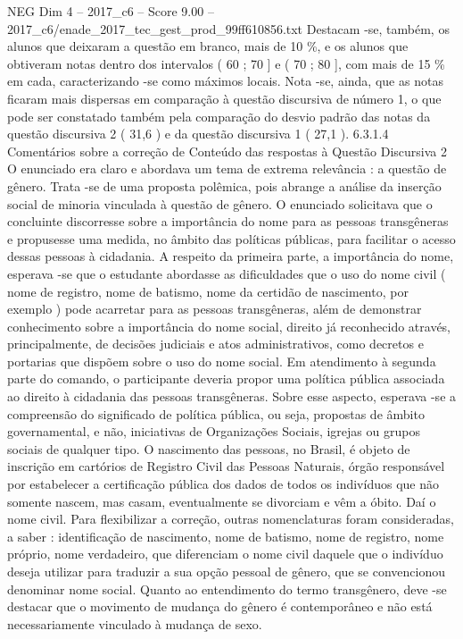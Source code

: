 \begin{textsample}{NEG Dim 4 – 2017\_c6 – Score 9.00 – 2017\_c6/enade\_2017\_tec\_gest\_prod\_99ff610856.txt}
Destacam -se, também, os alunos que deixaram a questão em branco, mais de 10 \%, e os alunos que obtiveram notas dentro dos intervalos ( 60 ; 70 ] e ( 70 ; 80 ], com mais de 15 \% em cada, caracterizando -se como máximos locais.
Nota -se, ainda, que as notas ficaram mais dispersas em comparação à questão discursiva de número 1, o que pode ser constatado também pela comparação do desvio padrão das notas da questão discursiva 2 ( 31,6 ) e da questão discursiva 1 ( 27,1 ). 6.3.1.4 Comentários sobre a correção de Conteúdo das respostas à Questão Discursiva 2 O enunciado era claro e abordava um tema de extrema relevância : a questão de gênero.
Trata -se de uma proposta polêmica, pois abrange a análise da inserção social de minoria vinculada à questão de gênero.
O enunciado solicitava que o concluinte discorresse sobre a importância do nome para as pessoas transgêneras e propusesse uma medida, no âmbito das políticas públicas, para facilitar o acesso dessas pessoas à cidadania.
A respeito da primeira parte, a importância do nome, esperava -se que o estudante abordasse as dificuldades que o uso do nome civil ( nome de registro, nome de batismo, nome da certidão de nascimento, por exemplo ) pode acarretar para as pessoas transgêneras, além de demonstrar conhecimento sobre a importância do nome social, direito já reconhecido através, principalmente, de decisões judiciais e atos administrativos, como decretos e portarias que dispõem sobre o uso do nome social.
Em atendimento à segunda parte do comando, o participante deveria propor uma política pública associada ao direito à cidadania das pessoas transgêneras.
Sobre esse aspecto, esperava -se a compreensão do significado de política pública, ou seja, propostas de âmbito governamental, e não, iniciativas de Organizações Sociais, igrejas ou grupos sociais de qualquer tipo.
O nascimento das pessoas, no Brasil, é objeto de inscrição em cartórios de Registro Civil das Pessoas Naturais, órgão responsável por estabelecer a certificação pública dos dados de todos os indivíduos que não somente nascem, mas casam, eventualmente se divorciam e vêm a óbito.
Daí o nome civil.
Para flexibilizar a correção, outras nomenclaturas foram consideradas, a saber : identificação de nascimento, nome de batismo, nome de registro, nome próprio, nome verdadeiro, que diferenciam o nome civil daquele que o indivíduo deseja utilizar para traduzir a sua opção pessoal de gênero, que se convencionou denominar nome social.
Quanto ao entendimento do termo transgênero, deve -se destacar que o movimento de mudança do gênero é contemporâneo e não está necessariamente vinculado à mudança de sexo.

\end{textsample}
